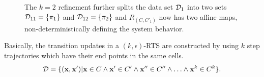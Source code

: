 \begin{figure}[!htbp]
\begin{center}
\begin{tikzpicture}
\end{tikzpicture}
\end{center}
\vspace*{-.3cm}
\caption{The $k=2$ refinement further splits the data set $\ds_1$
    into two sets $\ds_{11} = \setof{\pi_1}$ and $\ds_{12} =
    \setof{\pi_2}$ and $R_{(C,C'_1)}$ now has two affine maps,
    non-deterministically defining the system behavior.}
\label{fig:k2}
\vspace*{-.3cm}
\end{figure}


Basically, the transition updates in a $(k,\epsilon)$-RTS are
constructed by using $k$ step trajectories which have their end points
in the same cells.
\[
    \ds = \setof{(\vx,\vx') | \vx \in C \land \vx' \in C' \land \vx''
    \in C'' \land \ldots \land \vx^k \in C^k }.
\]


